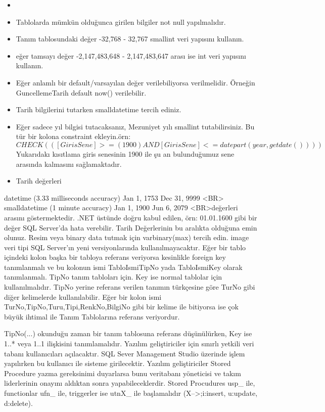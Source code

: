 \documentclass[10pt,a4paper,draft]{article}
\begin{document}
\begin{itemize}
\item  		 
\item   Tablolarda mümkün olduğunca girilen bilgiler not null yapılmalıdır.
\item   Tanım tablosundaki değer  -32,768 - 32,767   smallint veri yapısını kullanın.
\item   eğer tamsayı değer  -2,147,483,648 - 2,147,483,647 arası ise int veri yapısını kullanın.
\item   Eğer anlamlı bir default/varsayılan değer verilebiliyorsa verilmelidir. Örneğin GuncellemeTarih default now() verilebilir.
	 

\item   			Tarih bilgilerini tutarken smalldatetime tercih ediniz. 			
\item   Eğer sadece  yıl bilgisi tutacaksanız, Mezuniyet yılı smallint tutabilirsiniz. 
Bu tür bir kolona constraint ekleyin.örn: 
  $  CHECK  (([GirisSene]>=(1900) AND   [GirisSene]<=datepart(year,getdate()))) $
Yukarıdakı kısıtlama 
  giris senesinin 1900 ile şu an bulunduğumuz sene arasında kalmasını 
  sağlamaktadır.
\item Tarih değerleri 
\end{itemize}  			
  		 
  
  				datetime (3.33 milliseconds accuracy)  	Jan 1, 1753  	Dec 31, 9999
  				 <BR>				smalldatetime (1 minute accuracy) 	Jan 1, 1900 	Jun 6, 2079		
  				 <BR>değerleri arasını göstermektedir. .NET üstünde doğru kabul edilen, 
  örn: 01.01.1600 gibi bir değer SQL Server'da				hata verebilir. Tarih 
  Değerlerinin bu aralıkta olduğuna emin olunuz.						 
  			Resim veya binary data tutmak için varbinary(max) tercih edin. image 
  veri tipi SQL Server'ın yeni versiyonlarında			kullanılmayacaktır.		 
  			Eğer bir tablo içindeki kolon başka bir tabloya referans veriyorsa 
  kesinlikle foreign key tanımlanmalı ve bu			kolonun ismi TabloIsmiTipNo yada 
  TabloIsmiKey olarak tanımlanmalı. TipNo tanım tabloları için. Key ise normal 
  tablolar			için kullanılmalıdır.	
    TipNo yerine referans verilen tanımın türkçesine göre TurNo
    gibi diğer kelimelerde kullanılabilir.
    Eğer bir kolon ismi TurNo,TipNo,Turu,Tipi,RenkNo,BilgiNo
    gibi bir kelime ile bitiyorsa ise çok büyük ihtimal ile
    Tanım Tablolarına referans veriyordur.
    

  
  			TipNo(...) okunduğu zaman bir tanım tablosuna referans düşünülürken, Key ise 
  1..* veya 1..1 ilişkisini tanımlamalıdır.		 
  			Yazılım geliştiriciler için sınırlı yetkili veri tabanı kullanıcıları 
  açılacaktır. SQL Sever Management Studio üzerinde işlem			yapılırken bu 
  kullanıcı ile sisteme girilecektir.		 
  			Yazılım geliştiriciler Stored Procedure yazma gereksinimi duyarlarsa 
  bunu veritabanı yöneticisi ve takım liderlerinin onayını			 aldıktan sonra 
  yapabileceklerdir.		 
  			Stored Procudures usp\_ ile, functionlar ufn\_ ile, triggerler ise 
  utnX\_ ile başlamalıdır (X-->;i:insert, u:update, d:delete). 			
  
\end{document}
